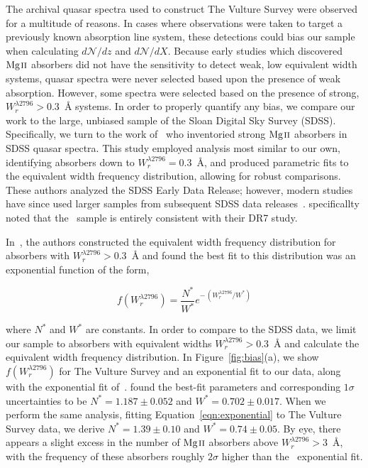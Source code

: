 \documentclass[iop,apj,numberedappendix,appendixfloats,twocolappendix]{emulateapj}
\begin{document}
The archival quasar spectra used to construct The Vulture Survey were observed for a multitude of reasons. In cases where observations were taken to target a previously known absorption line system, these detections could bias our sample when calculating $d\mathcal{N}\!/dz$ and $d\mathcal{N}\!/dX$. Because early studies which discovered ${\hbox{{\rm Mg}\kern 0.1em{\sc ii}}}$ absorbers did not have the sensitivity to detect weak, low equivalent width systems, quasar spectra were never selected based upon the presence of weak absorption. However, some spectra were selected based on the presence of strong, $W_r^{\lambda2796} > 0.3$~{\AA} systems. In order to properly quantify any bias, we compare our work to the large, unbiased sample of the Sloan Digital Sky Survey (SDSS). Specifically, we turn to the work of~\cite{Nestor2005} who inventoried strong ${\hbox{{\rm Mg}\kern 0.1em{\sc ii}}}$ absorbers in SDSS quasar spectra. This study employed analysis most similar to our own, identifying absorbers down to $W_r^{\lambda2796} = 0.3$~{\AA}, and produced parametric fits to the equivalent width frequency distribution, allowing for robust comparisons. These authors analyzed the SDSS Early Data Release; however, modern studies have since used larger samples from subsequent SDSS data releases~\citep{Prochter2006,Lundgren2009,Quider2011,Seyffert2013,Zhu2013,Raghunathan2016}. \cite{Zhu2013} specificallty noted that the~\cite{Nestor2005} sample is entirely consistent with their DR7 study.

In~\cite{Nestor2005}, the authors constructed the equivalent width frequency distribution for absorbers with $W_r^{\lambda2796} > 0.3$~{\AA} and found the best fit to this distribution was an exponential function of the form,

\begin{equation}
f(W_r^{\lambda2796}) = \frac{N^*}{W^*} e^{-\,\left(W_r^{\lambda2796} / W^*\right)}
\label{eqn:exponential}
\end{equation}

\noindent where $N^*$ and $W^*$ are constants. In order to compare to the SDSS data, we limit our sample to absorbers with equivalent widths $W_r^{\lambda2796} > 0.3$~{\AA} and calculate the equivalent width frequency distribution. In Figure~\ref{fig:bias}(a), we show $f(W_r^{\lambda2796})$ for The Vulture Survey and an exponential fit to our data, along with the exponential fit of~\cite{Nestor2005}. \cite{Nestor2005} found the best-fit parameters and corresponding $1\sigma$ uncertainties to be $N^* = 1.187 \pm 0.052$ and $W^* = 0.702 \pm 0.017$. When we perform the same analysis, fitting Equation~\ref{eqn:exponential} to The Vulture Survey data, we derive $N^* = 1.39 \pm 0.10$ and $W^* = 0.74 \pm 0.05$. By eye, there appears a slight excess in the number of ${\hbox{{\rm Mg}\kern 0.1em{\sc ii}}}$ absorbers above $W_r^{\lambda2796} > 3$~{\AA}, with the frequency of these absorbers roughly $2\sigma$ higher than the~\cite{Nestor2005} exponential fit.
\end{document}
